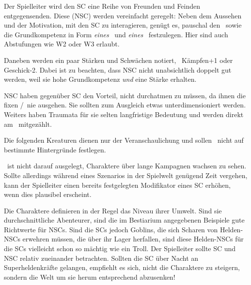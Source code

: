 {	

		\noindent
		Der Spielleiter wird den SC eine Reihe von Freunden und Feinden entgegensenden. Diese  (NSC) werden vereinfacht geregelt: Neben dem Aussehen und der Motivation, mit den SC zu interagieren, genügt es, pauschal den \HD\ sowie die Grundkompetenz in Form \emph{eines} \AD\ und \emph{eines} \RD\ festzulegen. Hier sind auch Abstufungen wie W2 oder W3 erlaubt.

		\nipajinTableNSC

		\noindent
		Daneben werden ein paar Stärken und Schwächen notiert, \zB\ Kämpfen+1 oder Geschick-2. Dabei ist zu beachten, dass NSC nicht unabsichtlich doppelt gut werden, weil sie hohe Grundkompetenz \emph{und} eine Stärke erhalten.

		NSC haben gegenüber SC den Vorteil, nicht durchatmen zu müssen, da ihnen die fixen \AD/\RD\ nie ausgehen. Sie sollten zum Ausgleich etwas unterdimensioniert werden. Weiters haben Traumata für sie selten langfristige Bedeutung und werden direkt am \HD\ mitgezählt.


		\noindent
		Die folgenden Kreaturen dienen nur der Veranschaulichung und sollen \nipajin\ nicht auf bestimmte Hintergründe festlegen.

		\nipajinTableBestiary


		\noindent
		\nipajin\ ist nicht darauf ausgelegt, Charaktere über lange Kampagnen wachsen zu sehen. Sollte allerdings während eines Szenarios in der Spielwelt genügend Zeit vergehen, kann der Spielleiter einen bereits festgelegten Modifikator eines SC erhöhen, wenn dies plausibel erscheint.

		Die Charaktere definieren in der Regel das Niveau ihrer Umwelt. Sind sie durchschnittliche Abenteurer, sind die im Bestiarium angegebenen Beispiele gute Richtwerte für NSCs. Sind die SCs jedoch Goblins, die sich Scharen von Helden-NSCs erwehren müssen, die über ihr Lager herfallen, sind diese Helden-NSCs für die SCs vielleicht schon so mächtig wie ein Troll. Der Spielleiter sollte SC und NSC relativ zueinander betrachten. Sollten die SC über Nacht an Super\-hel\-den\-kräfte gelangen, empfiehlt es sich, nicht die Charaktere zu steigern, sondern die Welt um sie herum entsprechend abzusenken!
}
